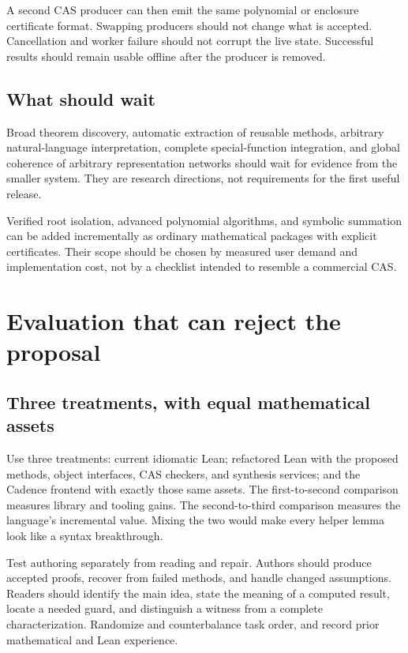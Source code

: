 \documentclass[11pt,letterpaper]{article}
\theoremstyle{definition}
\begin{document}
A second CAS producer can then emit the same polynomial or enclosure certificate
format. Swapping producers should not change what is accepted. Cancellation and
worker failure should not corrupt the live state. Successful results should remain
usable offline after the producer is removed.

\subsection{What should wait}
Broad theorem discovery, automatic extraction of reusable methods, arbitrary
natural-language interpretation, complete special-function integration, and global
coherence of arbitrary representation networks should wait for evidence from the
smaller system. They are research directions, not requirements for the first useful
release.

Verified root isolation, advanced polynomial algorithms, and symbolic summation
can be added incrementally as ordinary mathematical packages with explicit
certificates. Their scope should be chosen by measured user demand and
implementation cost, not by a checklist intended to resemble a commercial CAS.

\section{Evaluation that can reject the proposal}\label{sec:evaluation}
\subsection{Three treatments, with equal mathematical assets}
Use three treatments: current idiomatic Lean; refactored Lean with the proposed
methods, object interfaces, CAS checkers, and synthesis services; and the Cadence
frontend with exactly those same assets. The first-to-second comparison measures
library and tooling gains. The second-to-third comparison measures the language's
incremental value. Mixing the two would make every helper lemma look like a syntax
breakthrough.

Test authoring separately from reading and repair. Authors should produce accepted
proofs, recover from failed methods, and handle changed assumptions. Readers should
identify the main idea, state the meaning of a computed result, locate a needed
guard, and distinguish a witness from a complete characterization. Randomize and
counterbalance task order, and record prior mathematical and Lean experience.
\end{document}
